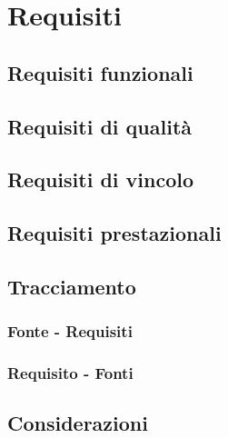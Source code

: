 \section{Requisiti}
\subsection{Requisiti funzionali}
\subsection{Requisiti di qualità}
\subsection{Requisiti di vincolo}
\subsection{Requisiti prestazionali}
\subsection{Tracciamento}
\subsubsection{Fonte - Requisiti}
\subsubsection{Requisito - Fonti}
\subsection{Considerazioni}




